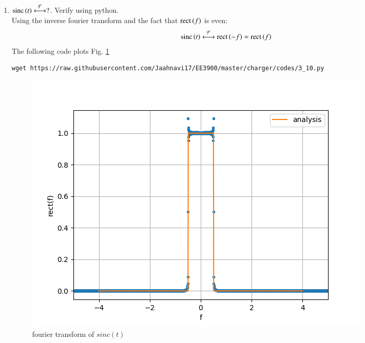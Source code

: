 \documentclass[journal,12pt,twocolumn]{IEEEtran}
\renewcommand\thesection{\arabic{section}}
\begin{document}
\begin{enumerate}[label=\thesection.\arabic*
,ref=\thesection.\theenumi]
 \item 
$	 \text{sinc}\left(t\right)\overset{\mathcal{F}}{ \longleftrightarrow} ?$.  Verify using python.
\\\solution Using the inverse fourier transform and the fact that $\text{rect}\left(f\right)$ is even:
\begin{align}
    \text{sinc}\left(t\right)\overset{\mathcal{F}}{ \longleftrightarrow}\text{rect}\left(-f\right)=\text{rect}\left(f\right)
\end{align}
  The following code plots Fig. \ref{fig:sinc-ft}
	\begin{lstlisting}
wget https://raw.githubusercontent.com/Jaahnavi17/EE3900/master/charger/codes/3_10.py
\end{lstlisting}
	\begin{figure}[h!]
	    \centering
	    \includegraphics[width=\columnwidth]{figures/sinc-ft.png}
	    \caption{fourier transform of $sinc(t)$ }
	    \label{fig:sinc-ft}
	\end{figure}
\end{enumerate}
\end{document}
